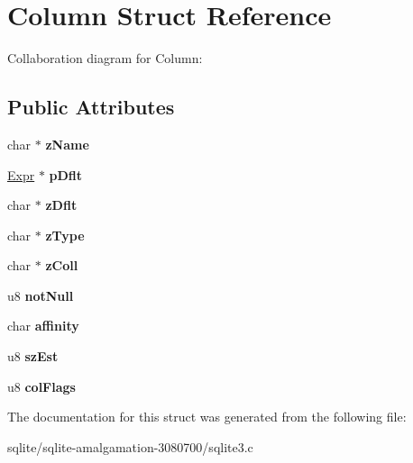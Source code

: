 \hypertarget{struct_column}{\section{Column Struct Reference}
\label{struct_column}
}


Collaboration diagram for Column\+:
\subsection*{Public Attributes}
\begin{DoxyCompactItemize}
\item 
\hypertarget{struct_column_a6450a4e9fde68b3a2d79425d826eccc3}{char $\ast$ {\bfseries z\+Name}}\label{struct_column_a6450a4e9fde68b3a2d79425d826eccc3}

\item 
\hypertarget{struct_column_ac4178f302df70048235660979f84ffe4}{\hyperlink{struct_expr}{Expr} $\ast$ {\bfseries p\+Dflt}}\label{struct_column_ac4178f302df70048235660979f84ffe4}

\item 
\hypertarget{struct_column_a88d29c685783cddfbd039e5674990f4b}{char $\ast$ {\bfseries z\+Dflt}}\label{struct_column_a88d29c685783cddfbd039e5674990f4b}

\item 
\hypertarget{struct_column_aef09f43479c4bd2d07f77d340020f95f}{char $\ast$ {\bfseries z\+Type}}\label{struct_column_aef09f43479c4bd2d07f77d340020f95f}

\item 
\hypertarget{struct_column_aa95909d5c77b321258622ed28d7b96eb}{char $\ast$ {\bfseries z\+Coll}}\label{struct_column_aa95909d5c77b321258622ed28d7b96eb}

\item 
\hypertarget{struct_column_a852e9a4c1c327a64d9b051dcafda3841}{u8 {\bfseries not\+Null}}\label{struct_column_a852e9a4c1c327a64d9b051dcafda3841}

\item 
\hypertarget{struct_column_ac9d6fe31c45888cecaf3f5ad5b93bf23}{char {\bfseries affinity}}\label{struct_column_ac9d6fe31c45888cecaf3f5ad5b93bf23}

\item 
\hypertarget{struct_column_a6d28f0023e550ea38ad2ab544942114d}{u8 {\bfseries sz\+Est}}\label{struct_column_a6d28f0023e550ea38ad2ab544942114d}

\item 
\hypertarget{struct_column_aadfed8f7a238c314e1499a6c4090f920}{u8 {\bfseries col\+Flags}}\label{struct_column_aadfed8f7a238c314e1499a6c4090f920}

\end{DoxyCompactItemize}


The documentation for this struct was generated from the following file\+:\begin{DoxyCompactItemize}
\item 
sqlite/sqlite-\/amalgamation-\/3080700/sqlite3.\+c\end{DoxyCompactItemize}
